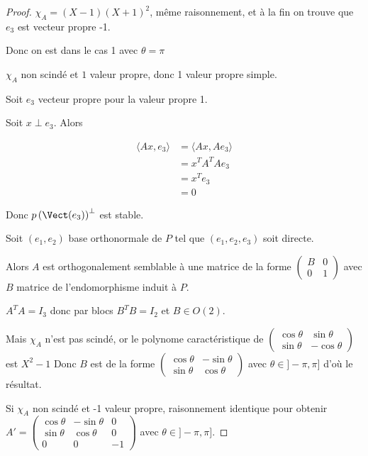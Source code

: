 \begin{proof}

    \svspace $\chi_A = (X - 1)(X + 1)^2$, même raisonnement, et à la fin on trouve que 
    $e_3$ est vecteur propre -1. 

    Donc on est dans le cas 1 avec $\theta = \pi$


    \svspace $\chi_A$ non scindé et $1$ valeur propre, donc 1 valeur propre simple. 

    Soit $e_3$ vecteur propre pour la valeur propre 1. 

    Soit $x \perp e_3$. Alors 

    \begin{align}
        \langle A x, e_3 \rangle & = \langle A x, A e_3 \rangle \\
        & = x^T A^T A e_3 \\
        & = x^T e_3 \\
        & = 0
    \end{align}

    Donc $p\left( \Vect(e_3) \right)^\perp$ est stable. 

    Soit $(e_1, e_2)$ base orthonormale de $P$ tel que $(e_1, e_2, e_3)$ soit directe. 

    Alors $A$ est orthogonalement semblable à une matrice de la forme $\begin{pmatrix}
        B & 0 \\
        0 & 1
    \end{pmatrix}$ avec $B$ matrice de l'endomorphisme induit à $P$. 

    $A^T A = I_3$ donc par blocs $B^T B = I_2$ et $B \in O(2)$.

    Mais $\chi_A$ n'est pas scindé, or le polynome caractéristique de 
    $\begin{pmatrix}
        \cos \theta & \sin \theta \\
        \sin \theta & - \cos \theta
    \end{pmatrix}$ est $X^2 - 1$ Donc $B$ est de la forme $\begin{pmatrix}
        \cos \theta & -\sin \theta \\
        \sin \theta & \cos \theta
    \end{pmatrix}$ avec $\theta \in ]- \pi, \pi]$ d'où le résultat. 


    Si $\chi_A$ non scindé et -1 valeur propre, raisonnement identique pour obtenir 
    $A' = \begin{pmatrix}
        \cos \theta & -\sin \theta & 0 \\
        \sin \theta & \cos \theta & 0 \\
        0 & 0 & -1
    \end{pmatrix}$ avec $\theta \in ]- \pi, \pi]$.
\end{proof}

